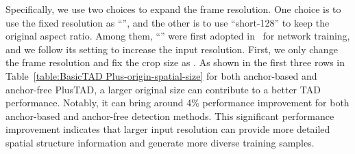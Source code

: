 \documentclass[a4paper,fleqn]{cas-dc}
\begin{document}
Specifically, we use two choices to expand the frame resolution. One choice is to use the fixed resolution as  ``'', and the other is to use ``short-128'' to keep the original aspect ratio. 
Among them, ``'' were first adopted in~\citep{r-c3d} for network training, and we follow its setting to increase the input resolution.
First, we only change the frame resolution and fix the crop size as .
As shown in the first three rows in Table~\ref{table:BasicTAD Plus-origin-spatial-size} for both anchor-based and anchor-free PlusTAD, a larger original size can contribute to a better TAD performance. Notably, it can bring around 4\% performance improvement for both anchor-based and anchor-free detection methods. This significant performance improvement indicates that larger input resolution can provide more detailed spatial structure information and generate more diverse training samples.
\end{document}
